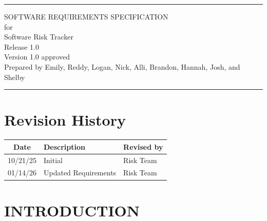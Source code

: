 \documentclass[letterpaper,12pt,oneside,listof=totoc,parskip=full]{scrreprt}
\date{\today}
\author{} %
\def\myversion{1.0 }
\begin{document}
\begin{titlepage}
\flushright
\rule{\textwidth}{5pt}\vskip1cm
\Huge{SOFTWARE REQUIREMENTS SPECIFICATION}\\
\vspace{1.5cm}
for\\
\vspace{1.5cm}
Software Risk Tracker\\                      %
\vspace{1.5cm}
\LARGE{Release 1.0\\}
\vspace{1.5cm}
\LARGE{Version \myversion approved\\}
\vspace{1.5cm}
\footnotesize{Prepared by Emily, Reddy, Logan, Nick, Alli, Brandon, Hannah, Josh, and Shelby}\\
\vfill
\rule{\textwidth}{5pt}
\end{titlepage}

\tableofcontents

\listoffigures


\chapter*{Revision History}

\begin{tabular}{| c  |p{}  |p{} |}
\hline
Date     & Description   & Revised by \\
\hline
 10/21/25 & Initial & Risk Team \\
 \hline
 01/14/26 & Updated Requirements & Risk Team\\
\hline
\end{tabular}



\chapter{INTRODUCTION}
\end{document}
